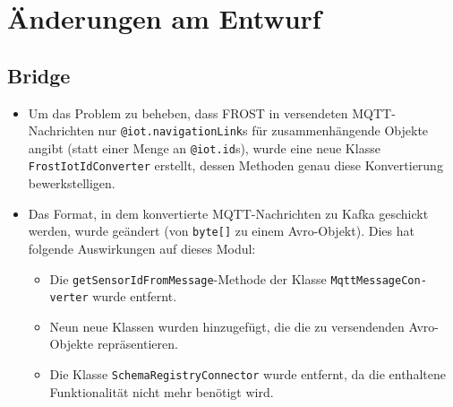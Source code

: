 \chapter{Änderungen am Entwurf}

\section{Bridge}
\begin{itemize}
	\item Um das Problem zu beheben, dass FROST in versendeten MQTT-Nachrichten nur \texttt{@iot.navigationLink}s für zusammenhängende Objekte angibt (statt einer Menge an \texttt{@iot.id}s), wurde eine neue Klasse \texttt{FrostIotIdConverter} erstellt, dessen Methoden genau diese Konvertierung bewerkstelligen.
	\item Das Format, in dem konvertierte MQTT-Nachrichten zu Kafka geschickt werden, wurde geändert (von \texttt{byte[]} zu einem Avro-Objekt). Dies hat folgende Auswirkungen auf dieses Modul:
	\begin{itemize}
		\item Die \texttt{getSensorIdFromMessage}-Methode der Klasse \texttt{MqttMessageCon-\\verter} wurde entfernt.
		\item Neun neue Klassen wurden hinzugefügt, die die zu versendenden Avro-Objekte repräsentieren.
		\item Die Klasse \texttt{SchemaRegistryConnector} wurde entfernt, da die enthaltene Funktionalität nicht mehr benötigt wird.
	\end{itemize}
\end{itemize}

